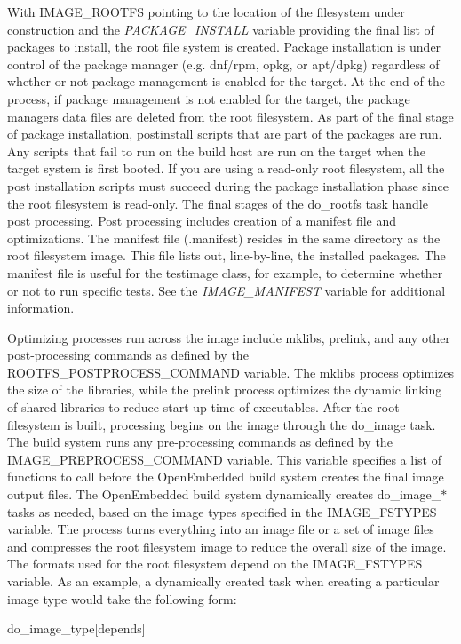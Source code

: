 \begin{DoxyItemize}
With I\+M\+A\+G\+E\+\_\+\+R\+O\+O\+T\+FS pointing to the location of the filesystem under construction and the {\itshape P\+A\+C\+K\+A\+G\+E\+\_\+\+I\+N\+S\+T\+A\+LL} variable providing the final list of packages to install, the root file system is created. Package installation is under control of the package manager (e.\+g. dnf/rpm, opkg, or apt/dpkg) regardless of whether or not package management is enabled for the target. At the end of the process, if package management is not enabled for the target, the package manager\textquotesingle{}s data files are deleted from the root filesystem. As part of the final stage of package installation, postinstall scripts that are part of the packages are run. Any scripts that fail to run on the build host are run on the target when the target system is first booted. If you are using a read-\/only root filesystem, all the post installation scripts must succeed during the package installation phase since the root filesystem is read-\/only. The final stages of the do\+\_\+rootfs task handle post processing. Post processing includes creation of a manifest file and optimizations. The manifest file (.manifest) resides in the same directory as the root filesystem image. This file lists out, line-\/by-\/line, the installed packages. The manifest file is useful for the testimage class, for example, to determine whether or not to run specific tests. See the {\itshape I\+M\+A\+G\+E\+\_\+\+M\+A\+N\+I\+F\+E\+ST} variable for additional information.

Optimizing processes run across the image include mklibs, prelink, and any other post-\/processing commands as defined by the R\+O\+O\+T\+F\+S\+\_\+\+P\+O\+S\+T\+P\+R\+O\+C\+E\+S\+S\+\_\+\+C\+O\+M\+M\+A\+ND variable. The mklibs process optimizes the size of the libraries, while the prelink process optimizes the dynamic linking of shared libraries to reduce start up time of executables. After the root filesystem is built, processing begins on the image through the do\+\_\+image task. The build system runs any pre-\/processing commands as defined by the I\+M\+A\+G\+E\+\_\+\+P\+R\+E\+P\+R\+O\+C\+E\+S\+S\+\_\+\+C\+O\+M\+M\+A\+ND variable. This variable specifies a list of functions to call before the Open\+Embedded build system creates the final image output files. The Open\+Embedded build system dynamically creates do\+\_\+image\+\_\+$\ast$ tasks as needed, based on the image types specified in the I\+M\+A\+G\+E\+\_\+\+F\+S\+T\+Y\+P\+ES variable. The process turns everything into an image file or a set of image files and compresses the root filesystem image to reduce the overall size of the image. The formats used for the root filesystem depend on the I\+M\+A\+G\+E\+\_\+\+F\+S\+T\+Y\+P\+ES variable. As an example, a dynamically created task when creating a particular image type would take the following form\+: \begin{DoxyVerb} do_image_type[depends]
\end{DoxyVerb}



\end{DoxyItemize}
